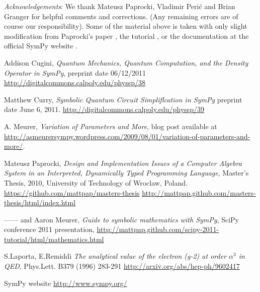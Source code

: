 \documentclass[12pt]{article}
\def\AM{Aaron Meurer}
\begin{document}
\vskip 0.3in

\noindent
{\it Acknowledgements}:
We thank Mateusz Paprocki, Vladimir Peri\'c and Brian Granger
for helpful comments and corrections. (Any remaining errors are of course our
responsibility). Some of the material above is taken
with only slight modification from Paprocki's paper
\cite{P}, the tutorial \cite{PM}, or the documentation at the official SymPy website
\cite{S}.



\begin{thebibliography}{99}

Addison Cugini,
{\it Quantum Mechanics, Quantum Computation, and the Density Operator in SymPy},
preprint date 06/12/2011
\newline
\url{http://digitalcommons.calpoly.edu/physsp/38}

Matthew Curry,
{\it Symbolic Quantum Circuit Simpliflcation in SymPy}
preprint date June 6, 2011.
\newline
\url{http://digitalcommons.calpoly.edu/physsp/39}

 A. Meurer,
{\it Variation of Parameters and More}, blog post available at
\newline
\url{http://asmeurersympy.wordpress.com/2009/08/01/variation-of-parameters-and-more/}.

Mateusz Paprocki,
{\it  Design and Implementation Issues of a Computer Algebra System
in an Interpreted, Dynamically Typed Programming Language},
Master's Thesis, 2010, University of Technology of
Wroclaw,  Poland.
\newline
\url{https://github.com/mattpap/masters-thesis}
\newline
\url{http://mattpap.github.com/masters-thesis/html/index.html}

------ and \AM,
{\it Guide to symbolic mathematics with SymPy},
SciPy conference 2011 presentation,
\newline
\url{http://mattpap.github.com/scipy-2011-tutorial/html/mathematics.html}

S.Laporta, E.Remiddi
{\it The analytical value of the electron (g-2) at order $\alpha^3$ in QED},
Phys.Lett. B379 (1996) 283-291
\newline
\url{http://arxiv.org/abs/hep-ph/9602417}


  SymPy website
\newline
\url{http://www.sympy.org/}



\end{thebibliography}
\end{document}

